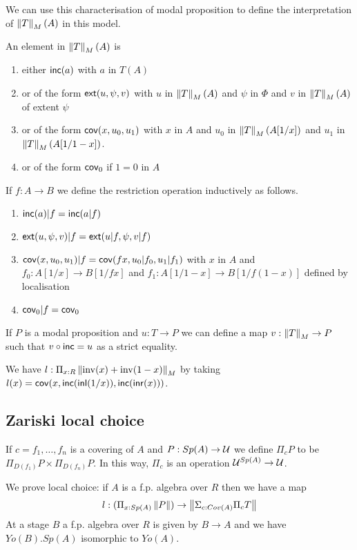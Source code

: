 \medskip

We can use this characterisation of modal proposition to define the interpretation of
$\left\lVert T \right\rVert_M(A)$ in this model.

An element in $\left\lVert T \right\rVert_M(A)$ is
\begin{enumerate}
\item either $\mathsf{inc}(a)$ with $a$ in $T(A)$
\item or of the form $\mathsf{ext}(u,\psi,v)$ with $u$ in $\left\lVert T \right\rVert_M(A)$ and $\psi$ in $\Phi$ and
  $v$ in $\left\lVert T \right\rVert_M(A)$ of extent $\psi$
\item or of the form $\mathsf{cov}(x,u_0,u_1)$ with $x$ in $A$ and $u_0$ in $\left\lVert T \right\rVert_M(A[1/x])$
  and $u_1$ in $\left\lVert T \right\rVert_M(A[1/1-x])$.
\item or of the form $\mathsf{cov}_0$ if $1 = 0$ in $A$  
\end{enumerate}

If $f:A\rightarrow B$ we define the restriction operation inductively as follows.
\begin{enumerate}
\item $\mathsf{inc}(a)|f = \mathsf{inc}(a|f)$
\item $\mathsf{ext}(u,\psi,v)|f = \mathsf{ext}(u|f,\psi,v|f)$
\item $\mathsf{cov}(x,u_0,u_1)|f = \mathsf{cov}(fx,u_0|f_0,u_1|f_1)$ with $x$ in $A$ 
 and $f_0:A[1/x]\rightarrow B[1/fx]$ and $f_1:A[1/1-x]\rightarrow B[1/f(1-x)]$ defined by localisation
\item $\mathsf{cov}_0|f = \mathsf{cov}_0$
\end{enumerate}

If $P$ is a modal proposition and $u:T\rightarrow P$ we can define a map $v:\left\lVert T \right\rVert_M\rightarrow P$
such that $v\circ\mathsf{inc} = u$ as a strict equality.

We have $l:\Pi_{x:R}\left\lVert \mathrm{inv}(x)+\mathrm{inv}(1-x) \right\rVert_M$ by taking $l(x) = \mathsf{cov}(x,\mathsf{inc}(\mathsf{inl}(1/x)),\mathsf{inc}(\mathsf{inr}(x)))$.

\subsection{Zariski local choice}

If $c = f_1,\dots,f_n$ is a covering of $A$ and $P:Sp(A)\rightarrow \mathcal{U}$ we define
$\Pi_c P$ to be $\Pi_{D(f_1)}P\times\Pi_{D(f_n)}P$. In this way, $\Pi_c$ is an operation
$\mathcal{U}^{Sp(A)}\rightarrow\mathcal{U}$.

We prove local choice: if $A$ is a f.p. algebra over $R$ then we have a map
$$
l:(\Pi_{x:Sp(A)}\left\lVert P \right\rVert)\rightarrow \left\lVert \Sigma_{c:Cov(A)}\Pi_cT \right\rVert
$$
At a stage $B$ a f.p. algebra over $R$ is given by $B\rightarrow A$ and we have $Yo(B).Sp(A)$ isomorphic
to $Yo(A)$.

